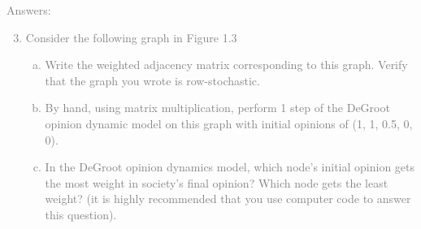 \documentclass[11pt]{article}
\begin{document}
\textcolor{gray}{
Answers:
\begin{enumerate}
	\setcounter{enumi}{2}
	\item Consider the following graph in Figure 1.3
	\begin{enumerate}[(a)]
		\item Write the weighted adjacency matrix corresponding to this graph. Verify that the graph you wrote is row-stochastic.
		\item By hand, using matrix multiplication, perform 1 step of the DeGroot opinion dynamic model on this graph with initial opinions of (1, 1, 0.5, 0, 0).
		\item In the DeGroot opinion dynamics model, which node's initial opinion gets the most weight in society's final opinion? Which node gets the least weight? (it is highly recommended that you use computer code to answer this question).
	\end{enumerate}	
\end{enumerate}
}
\end{document}
